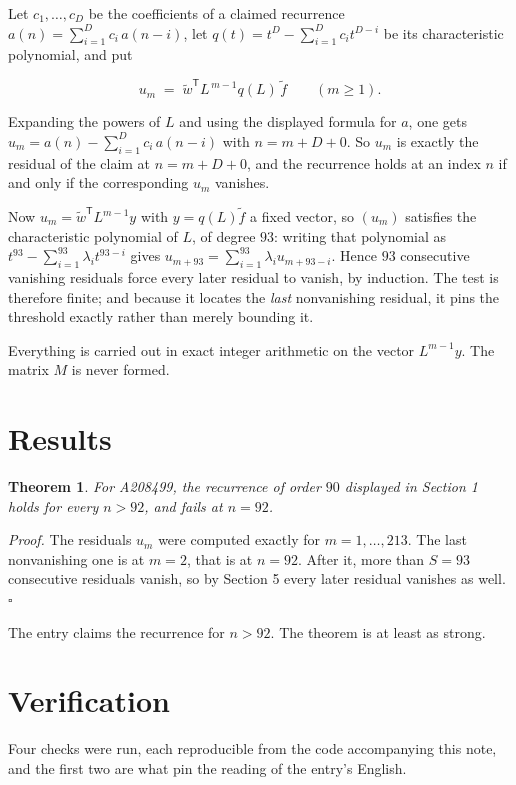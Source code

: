 \documentclass[11pt]{article}
\newtheorem{theorem}{Theorem}
\theoremstyle{definition}
\begin{document}
Let $c_1,\dots,c_D$ be the coefficients of a claimed recurrence $a(n) = \sum_{i=1}^{D} c_i\,a(n-i)$, let $q(t) = t^{D} - \sum_{i=1}^{D} c_i t^{D-i}$ be its characteristic polynomial, and put

\[u_m \;=\; \tilde w^{\mathsf T} L^{\,m-1} q(L)\,\tilde f \qquad (m \ge 1).\]

Expanding the powers of $L$ and using the displayed formula for $a$, one gets $u_m = a(n) - \sum_{i=1}^{D} c_i\,a(n-i)$ with $n = m + D + 0$. So $u_m$ is exactly the residual of the claim at $n = m + D + 0$, and the recurrence holds at an index $n$ if and only if the corresponding $u_m$ vanishes.

Now $u_m = \tilde w^{\mathsf T} L^{m-1} y$ with $y = q(L)\tilde f$ a fixed vector, so $(u_m)$ satisfies the characteristic polynomial of $L$, of degree $93$: writing that polynomial as $t^{93} - \sum_{i=1}^{93} \lambda_i t^{93-i}$ gives $u_{m+93} = \sum_{i=1}^{93} \lambda_i u_{m+93-i}$. Hence $93$ consecutive vanishing residuals force every later residual to vanish, by induction. The test is therefore finite; and because it locates the {\itshape last} nonvanishing residual, it pins the threshold exactly rather than merely bounding it.

Everything is carried out in exact integer arithmetic on the vector $L^{m-1}y$. The matrix $M$ is never formed.

\section{Results}

\begin{theorem} For A208499, the recurrence of order $90$ displayed in Section 1 holds for every $n > 92$, and fails at $n = 92$.\end{theorem}

{\itshape Proof.} The residuals $u_m$ were computed exactly for $m = 1,\dots,213$. The last nonvanishing one is at $m = 2$, that is at $n = 92$. After it, more than $S = 93$ consecutive residuals vanish, so by Section 5 every later residual vanishes as well. $\square$

The entry claims the recurrence for $n > 92$. The theorem is at least as strong.

\section{Verification}

Four checks were run, each reproducible from the code accompanying this note, and the first two are what pin the reading of the entry's English.
\end{document}
